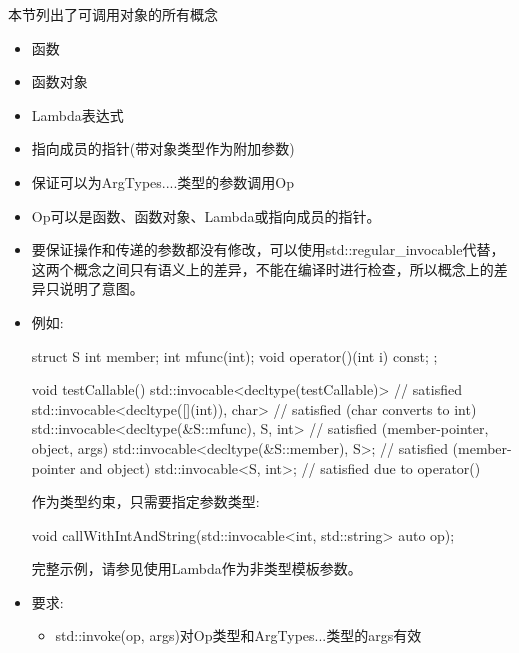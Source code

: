 
本节列出了可调用对象的所有概念

\begin{itemize}
\item
函数

\item
函数对象

\item
Lambda表达式

\item
指向成员的指针(带对象类型作为附加参数)
\end{itemize}



\begin{itemize}
\item
保证可以为ArgTypes....类型的参数调用Op

\item
Op可以是函数、函数对象、Lambda或指向成员的指针。

\item
要保证操作和传递的参数都没有修改，可以使用std::regular\_invocable代替，这两个概念之间只有语义上的差异，不能在编译时进行检查，所以概念上的差异只说明了意图。

\item
例如:

\begin{cpp}
struct S {
	int member;
	int mfunc(int);
	void operator()(int i) const;
};

void testCallable()
{
	std::invocable<decltype(testCallable)> // satisfied
	std::invocable<decltype([](int){}), char> // satisfied (char converts to int)
	std::invocable<decltype(&S::mfunc), S, int> // satisfied (member-pointer, object, args)
	std::invocable<decltype(&S::member), S>; // satisfied (member-pointer and object)
	std::invocable<S, int>; // satisfied due to operator()
}
\end{cpp}

作为类型约束，只需要指定参数类型:

\begin{cpp}
void callWithIntAndString(std::invocable<int, std::string> auto op);
\end{cpp}

完整示例，请参见使用Lambda作为非类型模板参数。

\item
要求:
\begin{itemize}
\item
std::invoke(op, args)对Op类型和ArgTypes...类型的args有效
\end{itemize}
\end{itemize}

